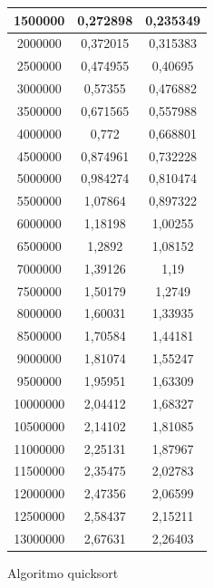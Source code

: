 \documentclass[12pt,spanish]{article}
\begin{document}
\begin{figure}[H]
\begin{tabular}{|c|c|c|}
\hline
1500000 & 0,272898 & 0,235349 \\
\hline
2000000 & 0,372015 & 0,315383 \\
\hline
2500000 & 0,474955 & 0,40695 \\
\hline
3000000 & 0,57355 & 0,476882 \\
\hline
3500000 & 0,671565 & 0,557988 \\
\hline
4000000 & 0,772 & 0,668801 \\
\hline
4500000 & 0,874961 & 0,732228 \\
\hline
5000000 & 0,984274 & 0,810474 \\
\hline
5500000 & 1,07864 & 0,897322 \\
\hline
6000000 & 1,18198 & 1,00255 \\
\hline
6500000 & 1,2892 & 1,08152 \\
\hline
7000000 & 1,39126 & 1,19 \\
\hline
7500000 & 1,50179 & 1,2749 \\
\hline
8000000 & 1,60031 & 1,33935 \\
\hline
8500000 & 1,70584 & 1,44181 \\
\hline
9000000 & 1,81074 & 1,55247 \\
\hline
9500000 & 1,95951 & 1,63309 \\
\hline
10000000 & 2,04412 & 1,68327 \\
\hline
10500000 & 2,14102 & 1,81085 \\
\hline
11000000 & 2,25131 & 1,87967 \\
\hline
11500000 & 2,35475 & 2,02783 \\
\hline
12000000 & 2,47356 & 2,06599 \\
\hline
12500000 & 2,58437 & 2,15211 \\
\hline
13000000 & 2,67631 & 2,26403 \\
\hline
\end{tabular}
\caption{Algoritmo quicksort}
\end{figure}
\end{document}
